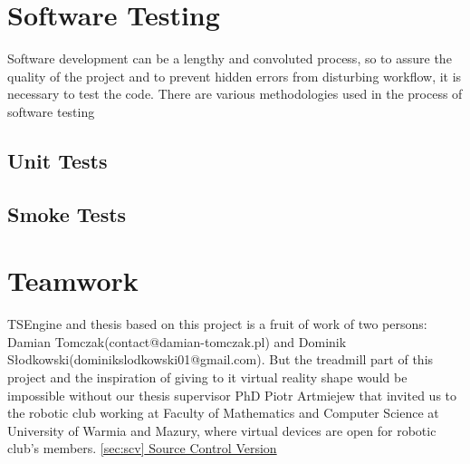 \newpage
\section{Software Testing}
\label{sec:testing}
Software development can be a lengthy and convoluted process, so to assure the quality of the project and to prevent hidden errors from disturbing workflow, it is necessary to test the code. There are various methodologies used in the process of software testing
\subsection{Unit Tests} %
\subsection{Smoke Tests}
\newpage
\section{Teamwork}
\label{sec:teamwork}
TSEngine and thesis based on this project is a fruit of work of two persons: Damian Tomczak(contact@damian-tomczak.pl) and Dominik Słodkowski(dominikslodkowski01@gmail.com).
But the treadmill part of this project and the inspiration of giving to it virtual reality shape would be impossible without our thesis supervisor PhD Piotr Artmiejew that invited us to the robotic club working at Faculty of Mathematics and Computer Science at University of Warmia and Mazury, where virtual devices are open for robotic club's members.
\hyperref[sec:scv]{\ref*{sec:scv} Source Control Version} %
